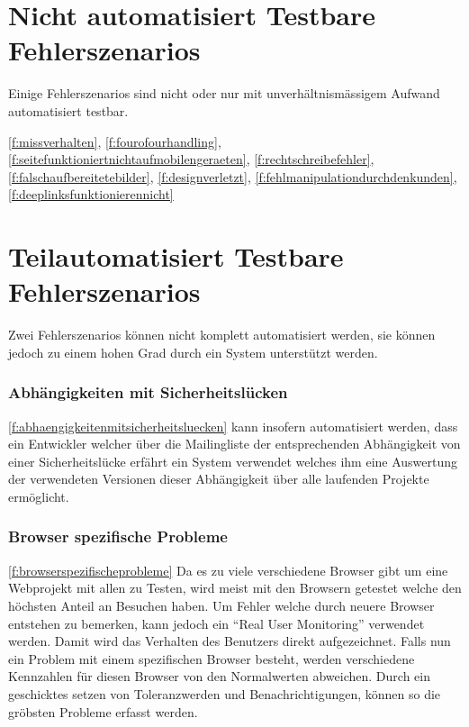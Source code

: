 
\section{Nicht automatisiert Testbare Fehlerszenarios}
\label{sec:nicht_automatisiert_testbare_fehlerszenarios}
Einige Fehlerszenarios sind nicht oder nur mit unverhältnismässigem Aufwand automatisiert testbar.

\ref{f:missverhalten}, \ref{f:fourofourhandling}, \ref{f:seitefunktioniertnichtaufmobilengeraeten}, \ref{f:rechtschreibefehler}, \ref{f:falschaufbereitetebilder}, \ref{f:designverletzt}, \ref{f:fehlmanipulationdurchdenkunden}, \ref{f:deeplinksfunktionierennicht}

\section{Teilautomatisiert Testbare Fehlerszenarios}
\label{sec:teilautomatisiert_testbare_fehlerszenarios}
Zwei Fehlerszenarios können nicht komplett automatisiert werden, sie können jedoch zu einem hohen Grad durch ein System unterstützt werden.

\subsubsection{Abhängigkeiten mit Sicherheitslücken}
\label{ssub:kat_abhaengigkeitenmitsicherheitsluecken}
\ref{f:abhaengigkeitenmitsicherheitsluecken} kann insofern automatisiert werden, dass ein Entwickler welcher über die Mailingliste der entsprechenden Abhängigkeit von einer Sicherheitslücke erfährt ein System verwendet welches ihm eine Auswertung der verwendeten Versionen dieser Abhängigkeit über alle laufenden Projekte ermöglicht.

\subsubsection{Browser spezifische Probleme}
\label{ssub:kat_browser_spezifische_probleme}
\ref{f:browserspezifischeprobleme} Da es zu viele verschiedene Browser gibt um eine Webprojekt mit allen zu Testen, wird meist mit den Browsern getestet welche den höchsten Anteil an Besuchen haben. Um Fehler welche durch neuere Browser entstehen zu bemerken, kann jedoch ein ``Real User Monitoring'' verwendet werden. Damit wird das Verhalten des Benutzers direkt aufgezeichnet. Falls nun ein Problem mit einem spezifischen Browser besteht, werden verschiedene Kennzahlen für diesen Browser von den Normalwerten abweichen. Durch ein geschicktes setzen von Toleranzwerden und Benachrichtigungen, können so die gröbsten Probleme erfasst werden.

